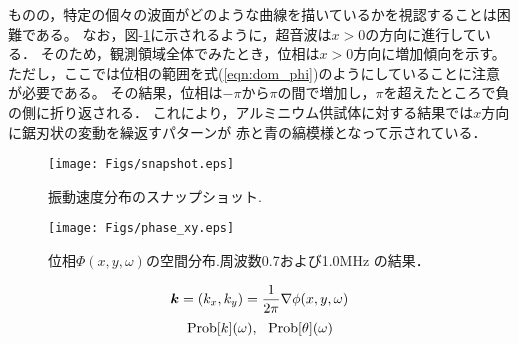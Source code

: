 ものの，特定の個々の波面がどのような曲線を描いているかを視認することは困難である。
なお，図-\ref{fig:fig4}に示されるように，超音波は$x>0$の方向に進行している．
そのため，観測領域全体でみたとき，位相は$x>0$方向に増加傾向を示す。
ただし，ここでは位相の範囲を式(\ref{eqn:dom_phi})のようにしていることに注意が必要である。
その結果，位相は$-\pi$から$\pi$の間で増加し，$\pi$を超えたところで負の側に折り返される．
これにより，アルミニウム供試体に対する結果では$x$方向に鋸刃状の変動を繰返すパターンが
赤と青の縞模様となって示されている．
\begin{figure}
\begin{center}
\texttt{[image: Figs/snapshot.eps]}
\caption{
	振動速度分布のスナップショット.
}
\label{fig:fig4}
\end{center}
\end{figure}
\begin{figure}
\begin{center}
	\texttt{[image: Figs/phase\_xy.eps]}
	\caption{位相$\Phi(x,y,\omega)$の空間分布.周波数0.7および1.0MHz
	の結果．}
	\label{fig:fig5}
\end{center}
\end{figure}
\begin{equation}
	\fat{k}= (k_x,k_y)= \frac{1}{2\pi} \nabla \phi (x,y,\omega)
	\label{eqn:}
\end{equation}
\begin{equation}
	{\rm Prob} [k](\omega), \ \ 
	{\rm Prob} [\theta](\omega)
	\label{eqn:}
\end{equation}
